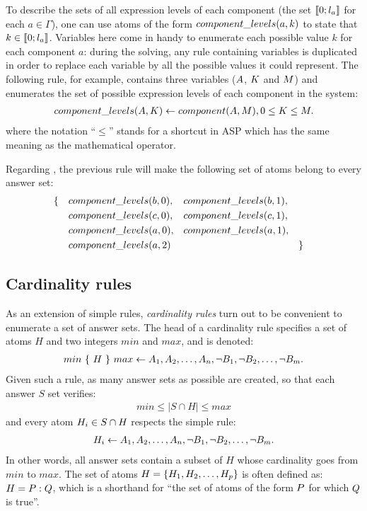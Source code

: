 To describe the sets of all expression levels of each component (\ie the set $\llbracket 0 ; l_a \rrbracket$ for each $a \in \Gamma$),
one can use atoms of the form $component\_levels(a, k)$ to state that $k \in \llbracket 0 ; l_a \rrbracket$.
Variables here come in handy to enumerate each possible value $k$ for each component $a$:
during the solving, any rule containing variables is duplicated in order to replace each variable by all the possible values it could represent.
The following rule, for example, contains three variables ($A$, $K$ and $M$) and enumerates the set of possible expression levels of each component in the system:
\begin{align*}
  component\_levels(A, K) \leftarrow component(A, M), 0 \leq K \leq M.
\end{align*}
where the notation “$\leq$” stands for a shortcut in ASP which has the same meaning as the mathematical operator.

\begin{example}
Regarding , the previous rule will make the following set of atoms belong to every answer set:
\begin{align*}
  &\{&&component\_levels(b, 0),
  &&component\_levels(b, 1), \\
  &&&component\_levels(c, 0),
  &&component\_levels(c, 1), \\
  &&&component\_levels(a, 0),
  &&component\_levels(a, 1), \\
  &&&component\_levels(a, 2) &&&&\}
\end{align*}
\end{example}

\subsection{Cardinality rules}
\label{sssec:cardinality_rules}
As an extension of simple rules, \emph{cardinality rules} turn out to be convenient to enumerate a set of answer sets.
The head of a cardinality rule specifies a set of atoms $H$ and two integers $min$ and $max$, and is denoted:
\begin{align*}
  min\ \{\ H\ \}\ max \leftarrow A_1, A_2, \dots, A_n, \neg B_1, \neg B_2, \dots, \neg B_m.
\end{align*}
Given such a rule, as many answer sets as possible are created, so that each answer $S$ set verifies:
\begin{align*}
  min \leq |S \cap H| \leq max
\end{align*}
and every atom $H_i \in S \cap H$ respects the simple rule:
\begin{align*}
  H_i \leftarrow A_1, A_2, \dots, A_n, \neg B_1, \neg B_2, \dots, \neg B_m.
\end{align*}
In other words, all answer sets contain a subset of $H$ whose cardinality goes from $min$ to $max$.
The set of atoms $H = \{ H_1, H_2, \dots, H_p \}$ is often defined as: $H = P : Q$,
which is a shorthand for “the set of atoms of the form $P$ for which $Q$ is true”.

